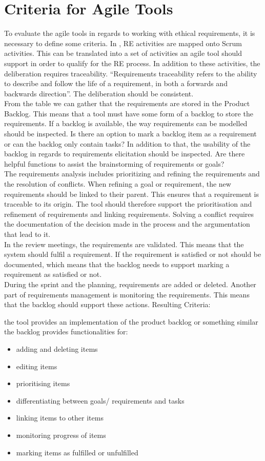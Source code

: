 \section{Criteria for Agile Tools}
To evaluate the agile tools in regards to working with ethical requirements, it is necessary to define some criteria. In \cite{de2010requirements:1}, RE activities are mapped onto Scrum activities. This can be translated into a set of activities an agile tool should support in order to qualify for the RE process. In addition to these activities, the deliberation requires traceability. “Requirements   traceability   refers to the ability to describe and follow the life of a requirement, in both a forwards and backwards direction”\cite{de2010requirements:1}. The deliberation should be consistent.\\
From the table we can gather that the requirements are stored in the Product Backlog. This means that a tool must have some form of a backlog to store the requirements. If a backlog is available, the way requirements can be modelled should be inspected. Is there an option to mark a backlog item as a requirement or can the backlog only contain tasks? In addition to that, the usability of the backlog in regards to requirements elicitation should be inspected. Are there helpful functions to assist the brainstorming of requirements or goals?\\
The requirements analysis includes prioritizing and refining the requirements and the resolution of conflicts. When refining a goal or requirement, the new requirements should be linked to their parent. This ensures that a requirement is traceable to its origin. The tool should therefore support the prioritisation and refinement of requirements and linking requirements. Solving a conflict requires the documentation of the decision made in the process and the argumentation that lead to it.\\
In the review meetings, the requirements are validated. This means that the system should fulfil a requirement. If the requirement is satisfied or not should be documented, which means that the backlog needs to support marking a requirement as satisfied or not.\\
During the sprint and the planning, requirements are added or deleted. Another part of requirements management is monitoring the requirements. This means that the backlog should support these actions.
Resulting Criteria:

the tool provides an implementation of the product backlog or something similar
the backlog provides functionalities for:
\begin{itemize}
\item adding and deleting items
\item editing items
\item prioritising items
\item differentiating between goals/ requirements and tasks
\item linking items to other items
\item monitoring progress of items
\item marking items as fulfilled or unfulfilled
\end{itemize}

